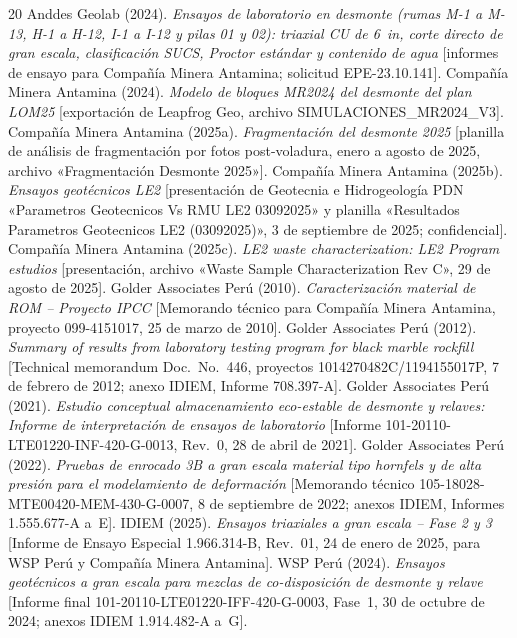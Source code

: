 \documentclass[11pt,letterpaper]{article}
\begin{document}
\begin{thebibliography}{20}\small
{} Anddes Geolab (2024). \emph{Ensayos de laboratorio en desmonte (rumas M-1 a M-13, H-1 a H-12, I-1 a I-12 y pilas 01 y 02): triaxial CU de 6~in, corte directo de gran escala, clasificación SUCS, Proctor estándar y contenido de agua} [informes de ensayo para Compañía Minera Antamina; solicitud EPE-23.10.141].
 Compañía Minera Antamina (2024). \emph{Modelo de bloques MR2024 del desmonte del plan LOM25} [exportación de Leapfrog Geo, archivo SIMULACIONES\_MR2024\_V3].
 Compañía Minera Antamina (2025a). \emph{Fragmentación del desmonte 2025} [planilla de análisis de fragmentación por fotos post-voladura, enero a agosto de 2025, archivo «Fragmentación Desmonte 2025»].
 Compañía Minera Antamina (2025b). \emph{Ensayos geotécnicos LE2} [presentación de Geotecnia e Hidrogeología PDN «Parametros Geotecnicos Vs RMU LE2 03092025» y planilla «Resultados Parametros Geotecnicos LE2 (03092025)», 3 de septiembre de 2025; confidencial].
 Compañía Minera Antamina (2025c). \emph{LE2 waste characterization: LE2 Program estudios} [presentación, archivo «Waste Sample Characterization Rev C», 29 de agosto de 2025].
 Golder Associates Perú (2010). \emph{Caracterización material de ROM -- Proyecto IPCC} [Memorando técnico para Compañía Minera Antamina, proyecto 099-4151017, 25 de marzo de 2010].
 Golder Associates Perú (2012). \emph{Summary of results from laboratory testing program for black marble rockfill} [Technical memorandum Doc.~No.~446, proyectos 1014270482C/1194155017P, 7 de febrero de 2012; anexo IDIEM, Informe 708.397-A].
 Golder Associates Perú (2021). \emph{Estudio conceptual almacenamiento eco-estable de desmonte y relaves: Informe de interpretación de ensayos de laboratorio} [Informe 101-20110-LTE01220-INF-420-G-0013, Rev.~0, 28 de abril de 2021].
 Golder Associates Perú (2022). \emph{Pruebas de enrocado 3B a gran escala material tipo hornfels y de alta presión para el modelamiento de deformación} [Memorando técnico 105-18028-MTE00420-MEM-430-G-0007, 8 de septiembre de 2022; anexos IDIEM, Informes 1.555.677-A a~E].
 IDIEM (2025). \emph{Ensayos triaxiales a gran escala -- Fase 2 y 3} [Informe de Ensayo Especial 1.966.314-B, Rev.~01, 24 de enero de 2025, para WSP Perú y Compañía Minera Antamina].
 WSP Perú (2024). \emph{Ensayos geotécnicos a gran escala para mezclas de co-disposición de desmonte y relave} [Informe final 101-20110-LTE01220-IFF-420-G-0003, Fase~1, 30 de octubre de 2024; anexos IDIEM 1.914.482-A a~G].
\end{thebibliography}
\end{document}
